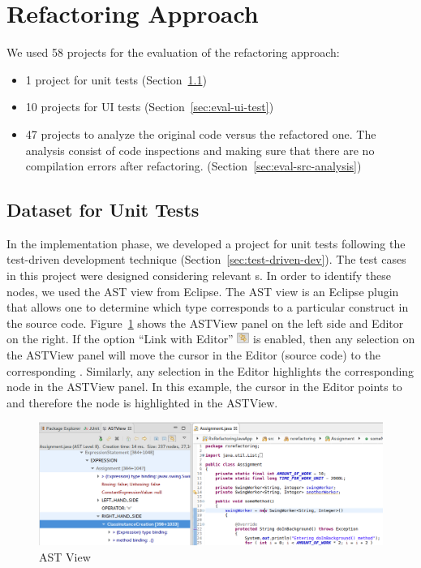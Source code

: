 \documentclass[type=bsc,accentcolor=tud9c]{tudthesis}
\begin{document}
\section{Refactoring Approach}
We used 58 projects for the evaluation of the refactoring approach:
\begin{itemize}
	\item 1 project for unit tests (Section~\ref{sec:eval-unit-test})
	\item 10 projects for UI tests (Section~\ref{sec:eval-ui-test})
	\item 47 projects to analyze the original code versus the refactored one. The analysis consist of code inspections and making sure that there are no compilation errors after refactoring. (Section~\ref{sec:eval-src-analysis})
\end{itemize}

\subsection{Dataset for Unit Tests}
\label{sec:eval-unit-test}
In the implementation phase, we developed a project for unit tests following the test-driven development technique (Section~\ref{sec:test-driven-dev}). The test cases in this project were designed considering  relevant s. In order to identify these nodes, we used the AST view from Eclipse. The AST view is an Eclipse plugin that allows one to determine which  type corresponds to a particular construct in the source code. Figure~\ref{fig:ast-view} shows the ASTView panel on the left side and Editor on the right. If the option ``Link with Editor'' \includegraphics[height=0.35cm]{unit-tests/link-to-editor.png} is enabled, then any selection on the ASTView panel will move the cursor in the Editor (source code) to the corresponding . Similarly, any selection in the Editor highlights the corresponding node in the ASTView panel. In this example, the cursor in the Editor points to ~ and therefore the node  is highlighted in the ASTView.

\begin{figure}[H]
\begin{center}
\includegraphics[width=17cm]{unit-tests/ASTView-vs-SrcCode.png}
\end{center}
\caption{AST View}
\label{fig:ast-view}
\end{figure}
\end{document}
